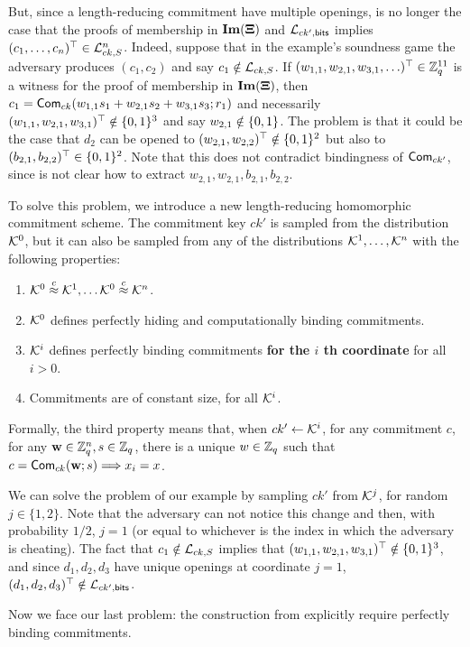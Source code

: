But, since a length-reducing commitment have multiple openings, is no longer the case that the proofs of membership in $\mathbf{Im}(\mathbf{{\Xi}})$ and $\mathcal{L}_{ck',\mathsf{bits}}$ implies $(c_1,\ldots,c_n)^\top\in\mathcal{L}_{ck,S}^n$. Indeed, suppose that in the example's soundness game the adversary produces $(c_1,c_2)$ and say $c_1\notin\mathcal{L}_{ck,S}$. If $(w_{1,1},w_{2,1},w_{3,1},\ldots)^\top\in\mathbb{Z}_q^{11}$ is a witness for the proof of membership in $\mathbf{Im}(\mathbf{{\Xi}})$, then $c_1=\mathsf{Com}_{ck}(w_{1,1}s_1+w_{2,1}s_2+w_{3,1}s_3;r_1)$ and necessarily $(w_{1,1},w_{2,1},w_{3,1})^\top\notin\{0,1\}^3$ and say $w_{2,1}\notin\{0,1\}$. The problem is that it could be the case that $d_2$ can be opened to $(w_{2,1},w_{2,2})^\top\notin\{0,1\}^2$ but also to $(b_{2,1},b_{2,2})^\top\in\{0,1\}^2$. Note that this does not contradict bindingness of $\mathsf{Com}_{ck'}$, since is not clear how to extract $w_{2,1},w_{2,1},b_{2,1},b_{2,2}$.

To solve this problem, we introduce a new length-reducing homomorphic commitment scheme. The commitment key $ck'$ is sampled from the distribution $\mathcal{K}^0$, but it can also be sampled from any of the distributions $\mathcal{K}^1,\ldots,\mathcal{K}^n$ with the following properties:
\begin{enumerate}
\item $\mathcal{K}^0\overset{c}{\approx}\mathcal{K}^1,\ldots\mathcal{K}^0\overset{c}{\approx}\mathcal{K}^n$.
\item $\mathcal{K}^0$ defines perfectly hiding and computationally binding commitments.
\item $\mathcal{K}^i$ defines perfectly binding commitments \textbf{for the $i$ th coordinate} for all $i>0$.
\item Commitments are of constant size, for all $\mathcal{K}^i$.
\end{enumerate} 
Formally, the third property means that, when $ck'\gets\mathcal{K}^i$, for any commitment $c$, for any $\mathbf{w}\in\mathbb{Z}_q^n,s\in\mathbb{Z}_q$, there is a unique $w\in\mathbb{Z}_q$ such that $c=\mathsf{Com}_{ck}(\mathbf{w};s)\Longrightarrow x_i=x$.

We can solve the problem of our example by sampling $ck'$ from $\mathcal{K}^j$, for random $j\in\{1,2\}$. Note that the adversary can not notice this change and then, with probability $1/2$, $j=1$ (or equal to whichever is the index in which the adversary is cheating). The fact that $c_1\notin\mathcal{L}_{ck,S}$ implies that $(w_{1,1},w_{2,1},w_{3,1})^\top\notin\{0,1\}^3$, and since $d_1,d_2,d_3$ have unique openings at coordinate $j=1$, $(d_1,d_2,d_3)^\top\notin\mathcal{L}_{ck',\mathsf{bits}}$.  

Now we face our last problem: the construction from \cite{AC:GonHevRaf15} explicitly require perfectly binding commitments.

